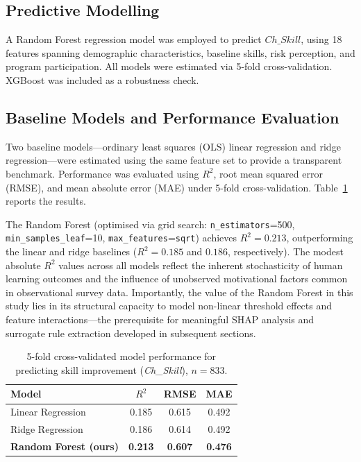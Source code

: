 \documentclass[3p,twocolumn,authoryear]{elsarticle}
\begin{document}
\subsection{Predictive Modelling}

A Random Forest regression model \citep{breiman2001} was employed
to predict $Ch\_Skill$, using 18 features spanning demographic
characteristics, baseline skills, risk perception, and program
participation.
All models were estimated via 5-fold cross-validation.
XGBoost \citep{chen2016} was included as a robustness check.

\subsection{Baseline Models and Performance Evaluation}

Two baseline models---ordinary least squares (OLS) linear
regression and ridge regression---were estimated using the same
feature set to provide a transparent benchmark.
Performance was evaluated using $R^{2}$, root mean squared error
(RMSE), and mean absolute error (MAE) under 5-fold cross-validation.
Table~\ref{tab:baseline_performance} reports the results.

The Random Forest (optimised via grid search:
\texttt{n\_estimators}=500, \texttt{min\_samples\_leaf}=10,
\texttt{max\_features}=\texttt{sqrt}) achieves $R^{2} = 0.213$,
outperforming the linear and ridge baselines ($R^{2} = 0.185$
and $0.186$, respectively).
The modest absolute $R^{2}$ values across all models reflect the
inherent stochasticity of human learning outcomes and the
influence of unobserved motivational factors common in
observational survey data.
Importantly, the value of the Random Forest in this study lies
in its structural capacity to model non-linear threshold effects
and feature interactions---the prerequisite for meaningful
SHAP analysis and surrogate rule extraction developed in
subsequent sections.

\begin{table}[htbp]
\centering
\caption{5-fold cross-validated model performance for predicting
         skill improvement (\textit{Ch\_Skill}), $n = 833$.}
\label{tab:baseline_performance}
\begin{tabular}{@{}lccc@{}}
\toprule
\textbf{Model} & \textbf{$R^{2}$} & \textbf{RMSE} & \textbf{MAE} \\
\midrule
Linear Regression  & 0.185 & 0.615 & 0.492 \\
Ridge Regression   & 0.186 & 0.614 & 0.492 \\
\textbf{Random Forest (ours)} & \textbf{0.213} & \textbf{0.607} & \textbf{0.476} \\
\bottomrule
\end{tabular}
\end{table}
\end{document}
